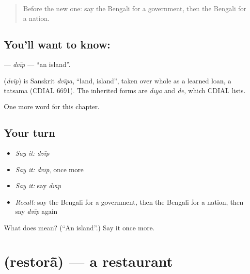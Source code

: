 \label{lesson:BN-C244-dvip}



\begin{quote}
Before the new one: say the Bengali for a government, then the Bengali for a nation.
\end{quote}

\subsection*{You'll want to know: }
\textbf{} — \emph{dvīp} — \textquotedblleft{}an island\textquotedblright{}.

\begin{cousinweb}
\textbf{} (\emph{dvīp}) is Sanskrit \emph{dvīpa}, \textquotedblleft{}land, island\textquotedblright{}, taken over whole as a learned loan, a tatsama (CDIAL 6691). The inherited forms are \emph{dīyā} and \emph{de}, which CDIAL lists.
\end{cousinweb}

\begin{grammarlens}[title={What you've built}]
One more word for this chapter.
\end{grammarlens}

\subsection*{Your turn}
\begin{itemize}
\raggedright
  \item \emph{Say it:} \emph{dvīp}
  \item \emph{Say it:} \emph{dvīp}, once more
  \item \emph{Say it:} say \emph{dvīp}
  \item \emph{Recall:} say the Bengali for a government, then the Bengali for a nation, then say \emph{dvīp} again
\end{itemize}

\begin{tcolorbox}[breakable,colback=teal!4,colframe=teal!35!black,title={Before you move on}]
What does  mean? (\textquotedblleft{}An island\textquotedblright{}.) Say it once more.
\end{tcolorbox}
\section[\texorpdfstring{\bn{রেস্তোরাঁ} (restorā̃)}{রেস্তোরাঁ (restorā̃)}]{ (restorā̃) — a restaurant}

